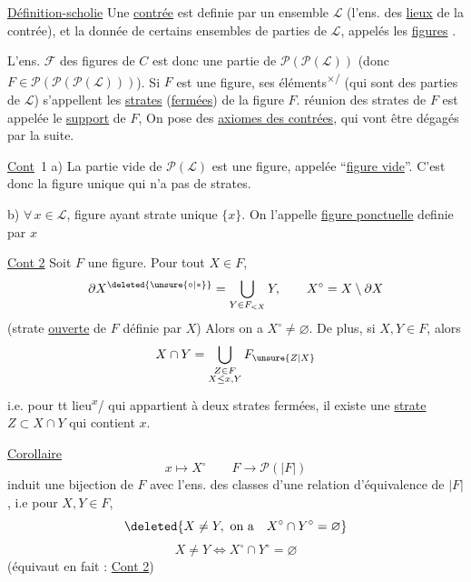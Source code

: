 \uline{Définition-scholie} Une \uline{contrée}  est definie par un ensemble $\mathcal{L}$ (l'ens. des \uline{lieux} de la contrée), et la donnée de certains ensembles de parties de $\mathcal{L}$, appelés les \uline{figures} .

L'ens. $\mathcal{F}$ des figures de $C$ est donc une  partie de $\mathcal{P}(\mathcal{P}(\mathcal{L}))$ (donc $F\in \mathcal{P}(\mathcal{P}(\mathcal{P}(\mathcal{L})))$). Si $F$ est une figure, ses éléments\textsuperscript{$\times$/} (qui sont des parties de $\mathcal{L}$) s'appellent les \uline{strates} (\uline{fermées}) de la figure $F$.  réunion des strates  de $F$ est appelée le \uline{support} de $F$,  On pose des \uline{axiomes des contrées}, qui vont être dégagés par la suite.

\uline{Cont}~1 \quad a) La partie vide de $\mathcal{P}(\mathcal{L})$ est une  figure, appelée ``\uline{figure vide}''. C'est donc la figure unique qui n'a pas de strates.

\margin{$\big\Vert$}
b) $\forall\,x\in \mathcal{L}$,  figure ayant  strate unique $\{x\}$. On l'appelle \uline{figure ponctuelle} definie par $x$

\uline{Cont 2} \quad Soit $F$ une figure.  Pour tout $X\in F$,  
\[
\partial X^{\deleted{\unsure{\circ|*}}}=\bigcup_{Y\in F_{<X}}Y,\qquad X^\circ=X\setminus\partial X
\]
(strate \uline{ouverte} de $F$ définie par $X$) Alors on a $\boxed{X^\circ\ne\varnothing}$. De plus, si $X,Y\in F$, alors
\[
X\cap Y=\bigcup_{\substack{Z\in F\\X\leq x,Y}}F_{\unsure{Z|X}}
\]
i.e.  pour tt  lieu\textsuperscript{$x$}/ qui appartient à deux strates fermées,  il existe une \uline{strate} $Z\subset X\cap Y$   qui contient $x$.

\uline{Corollaire}  
\[
x\longmapsto X^\circ\qquad F\longrightarrow \mathcal{P}(|F|)
\]
induit une bijection de $F$ avec l'ens. des classes d'une relation d'équivalence de $|F|$, i.e pour $X,Y\in F$,  
\[
\deleted{X\ne Y,\ \text{on a}\quad X^\circ\cap Y^\circ=\varnothing}
\]
\[
X\ne Y\iff X^\circ\cap Y^\circ=\varnothing
\]
(équivaut en fait : \uline{Cont 2})

